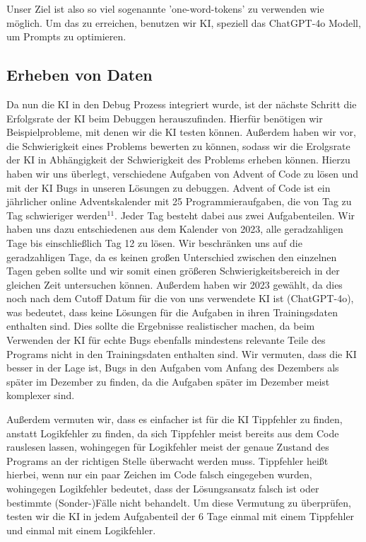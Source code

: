 \documentclass[a4paper,12pt,ngerman]{scrartcl}
\begin{document}
Unser Ziel ist also so viel sogenannte 'one-word-tokens' zu verwenden wie möglich. Um das zu erreichen, benutzen wir KI, speziell das ChatGPT-4o Modell, um Prompts zu optimieren.

\subsection{Erheben von Daten}

Da nun die KI in den Debug Prozess integriert wurde, ist der nächste Schritt die Erfolgsrate der KI beim Debuggen herauszufinden. Hierfür benötigen wir Beispielprobleme, mit denen wir die KI testen können. Außerdem haben wir vor, die Schwierigkeit eines Problems bewerten zu können, sodass wir die Erolgsrate der KI in Abhängigkeit der Schwierigkeit des Problems erheben können. Hierzu haben wir uns überlegt, verschiedene Aufgaben von Advent of Code zu lösen und mit der KI Bugs in unseren Lösungen zu debuggen. Advent of Code ist ein jährlicher online Adventskalender mit 25 Programmieraufgaben, die von Tag zu Tag schwieriger werden$^{11}$. Jeder Tag besteht dabei aus zwei Aufgabenteilen. Wir haben uns dazu entschiedenen aus dem Kalender von 2023, alle geradzahligen Tage bis einschließlich Tag 12 zu lösen. Wir beschränken uns auf die geradzahligen Tage, da es keinen großen Unterschied zwischen den einzelnen Tagen geben sollte und wir somit einen größeren Schwierigkeitsbereich in der gleichen Zeit untersuchen können. Außerdem haben wir 2023 gewählt, da dies noch nach dem Cutoff Datum für die von uns verwendete KI ist (ChatGPT-4o), was bedeutet, dass keine Lösungen für die Aufgaben in ihren Trainingsdaten enthalten sind. Dies sollte die Ergebnisse realistischer machen, da beim Verwenden der KI für echte Bugs ebenfalls mindestens relevante Teile des Programs nicht in den Trainingsdaten enthalten sind. Wir vermuten, dass die KI besser in der Lage ist, Bugs in den Aufgaben vom Anfang des Dezembers als später im Dezember zu finden, da die Aufgaben später im Dezember meist komplexer sind.

Außerdem vermuten wir, dass es einfacher ist für die KI Tippfehler zu finden, anstatt Logikfehler zu finden, da sich Tippfehler meist bereits aus dem Code rauslesen lassen, wohingegen für Logikfehler meist der genaue Zustand des Programs an der richtigen Stelle überwacht werden muss. Tippfehler heißt hierbei, wenn nur ein paar Zeichen im Code falsch eingegeben wurden, wohingegen Logikfehler bedeutet, dass der Lösungsansatz falsch ist oder bestimmte (Sonder-)Fälle nicht behandelt. Um diese Vermutung zu überprüfen, testen wir die KI in jedem Aufgabenteil der 6 Tage einmal mit einem Tippfehler und einmal mit einem Logikfehler.
\end{document}
